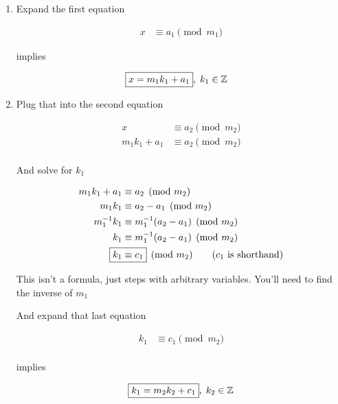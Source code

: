 \documentclass[../../Main.tex]{subfiles}
\begin{document}
\begin{enumerate}
    \item 
    {
        Expand the first equation

        \begin{align*}
            x &\equiv a_1 \pmod{m_1}
        \end{align*}

        implies

        \begin{align*}
            \Aboxed{x = m_1 k_1 + a_1}, \; k_1 \in \setZ
        \end{align*}
    }

    \item
    {
        Plug that into the second equation

        \begin{align*}
            x &\equiv a_2 \pmod{m_2} \\
            m_1 k_1 + a_1 &\equiv a_2 \pmod{m_2} \\
        \end{align*}

        And solve for $k_1$

        \begin{align*}
            m_1 k_1 + a_1 &\equiv a_2 \pmod{m_2} \\
            m_1 k_1 &\equiv a_2 - a_1 \pmod{m_2} \\
            m_1^{-1} k_1 &\equiv m_1^{-1}(a_2 - a_1) \pmod{m_2} \\
            k_1 &\equiv m_1^{-1}(a_2 - a_1) \pmod{m_2} \\
            \Aboxed{k_1 &\equiv c_1} \pmod{m_2} \tag{$c_1$ is shorthand} \\
        \end{align*}

        \begin{note}
            This isn't a formula, just steps with arbitrary variables. You'll need to find the inverse of $m_1$
        \end{note}

        And expand that last equation

        \begin{align*}
            k_1 &\equiv c_1 \pmod{m_2} \\
        \end{align*}

        implies

        \begin{align*}
            \Aboxed{k_1 &= m_2 k_2 + c_1}, \; k_2 \in \setZ \\
        \end{align*}
    } 


\end{enumerate}
\end{document}

